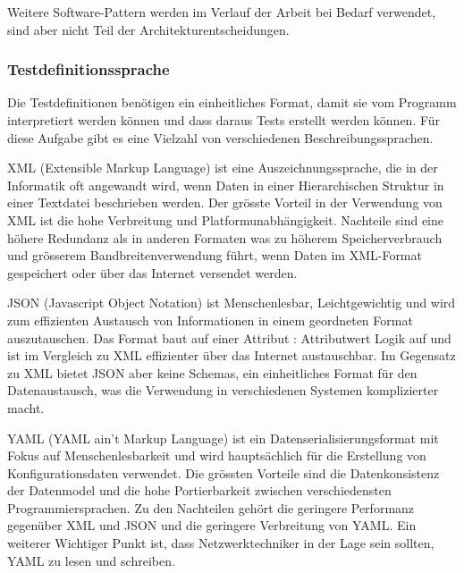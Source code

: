 \documentclass[]{subfiles}
\begin{document}
		Weitere Software-Pattern werden im Verlauf der Arbeit bei Bedarf verwendet, sind aber nicht Teil der Architekturentscheidungen.
		\newpage

		\subsubsection{Testdefinitionssprache}
		Die Testdefinitionen benötigen ein einheitliches Format, damit sie vom Programm interpretiert werden können und dass daraus Tests erstellt werden können.
		Für diese Aufgabe gibt es eine Vielzahl von verschiedenen Beschreibungssprachen.
		
		XML (Extensible Markup Language) ist eine Auszeichnungssprache, die in der Informatik oft angewandt wird, wenn Daten in einer Hierarchischen Struktur in einer Textdatei beschrieben werden.
		Der grösste Vorteil in der Verwendung von XML ist die hohe Verbreitung und Platformunabhängigkeit.
		Nachteile sind eine höhere Redundanz als in anderen Formaten was zu höherem Speicherverbrauch und grösserem Bandbreitenverwendung führt, wenn Daten im XML-Format gespeichert oder über das Internet versendet werden.

		JSON (Javascript Object Notation) ist Menschenlesbar, Leichtgewichtig und wird zum effizienten Austausch von Informationen in einem geordneten Format auszutauschen.
		Das Format baut auf einer Attribut : Attributwert Logik auf und ist im Vergleich zu XML effizienter über das Internet austauschbar.
		Im Gegensatz zu XML bietet JSON aber keine Schemas, ein einheitliches Format für den Datenaustausch, was die Verwendung in verschiedenen Systemen komplizierter macht.

		YAML (YAML ain't Markup Language) ist ein Datenserialisierungsformat mit Fokus auf Menschenlesbarkeit und wird hauptsächlich für die Erstellung von Konfigurationsdaten verwendet.
		Die grössten Vorteile sind die Datenkonsistenz der Datenmodel und die hohe Portierbarkeit zwischen verschiedensten Programmiersprachen.
		Zu den Nachteilen gehört die geringere Performanz gegenüber XML und JSON und die geringere Verbreitung von YAML.
		Ein weiterer Wichtiger Punkt ist, dass Netzwerktechniker in der Lage sein sollten, YAML zu lesen und schreiben.
\end{document}
